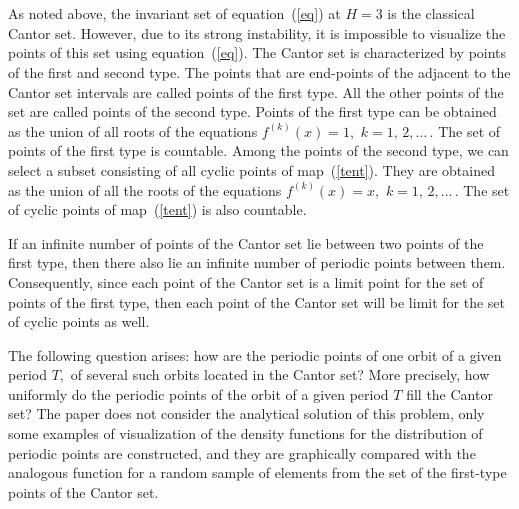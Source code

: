 \documentclass[12pt,a4paper]{amsart}
\begin{document}
\section{}

As noted above, the invariant set of equation~(\ref{eq}) at $H=3$ is the classical Cantor set. However, due to its strong instability, it is impossible to visualize 
the points of this set using equation~(\ref{eq}). The Cantor set is characterized by points of the first and second type. The points that are end-points of the adjacent 
to the Cantor set intervals are called points of the first type. All the other points of the set are called points of the second type. Points of the first type can be obtained 
as the union of all roots of the equations $f^{(k)}(x) = 1,$ $k=1,\,2,\ldots\,$. The set of points of the first type is countable. Among the points of the second type, we can select
a subset consisting of all cyclic points of map~(\ref{tent}). They are obtained as the union of all the roots of the equations $f^{(k)}(x) = x,$ $k=1,\,2,\ldots\,$. 
The set of cyclic points of map~(\ref{tent}) is also countable.

If an infinite number of points of the Cantor set lie between two points of the first type, then there also lie an infinite number of periodic points between them. 
Consequently, since each point of the Cantor set is a limit point for the set of points of the first type, then each point of the Cantor set will be limit for the set 
of cyclic points as well.

The following question arises: how are the periodic points of one orbit of a given period $T,$ of several such orbits located in the Cantor set? More precisely, how uniformly 
do the periodic points of the orbit of a given period $T$ fill the Cantor set? The paper does not consider the analytical solution of this problem, 
only some examples of visualization of the density functions for the distribution of periodic points are constructed, and they are graphically compared with 
the analogous function for a random sample of elements from the set of the first-type points of the Cantor set.
\end{document}
